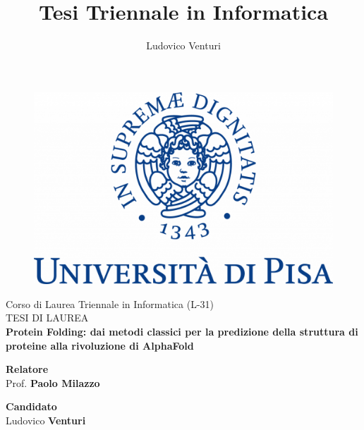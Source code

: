 \documentclass[12pt]{report}
\begin{document}
	
\author{Ludovico Venturi}
\title{Tesi Triennale in Informatica}
	
\begin{titlepage}
	\begin{figure}
		\centering\includegraphics[scale=0.2] {images/UNIPI_Logo.png}
	\end{figure}
	
	\begin{center}
		{\LARGE{ Corso di Laurea Triennale in Informatica (L-31) \\}}
		\vspace{2cm}
		{\Large { TESI DI LAUREA }}\\
		\vspace{2cm}
		{\LARGE { \textbf{Protein Folding: dai metodi classici per la predizione della struttura di proteine alla rivoluzione di AlphaFold} }}
	\end{center}
	
	\vspace{2cm}
	
	\begin{minipage}[t]{0.6\textwidth}
		{\large{\textbf{Relatore}\\ Prof. \textbf{Paolo Milazzo}}}
		\vspace{0.5cm}
	\end{minipage}\hfill\begin{minipage}[t]{0.3\textwidth}\raggedleft
		{\large{\textbf{Candidato} \\ Ludovico \textbf{Venturi}\\ }}
	\end{minipage}
	
	\vspace{25mm}
	
\end{titlepage}
\end{document}
